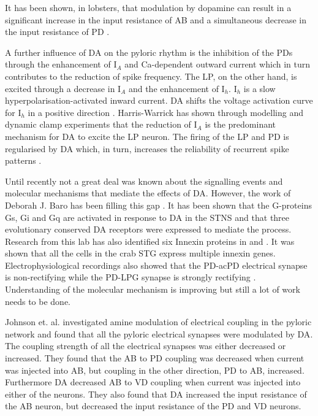 It has been shown, in lobsters, that modulation by dopamine can result in a significant increase in the input resistance of \ac{AB} and a simultaneous decrease in the input resistance of \ac{PD} \cite{Zhao2010}.

A further influence of \ac{DA} on the pyloric rhythm is the inhibition of the \ac{PD}s through the enhancement of I$_A$ and Ca-dependent outward current which in turn contributes to the reduction of spike frequency. The \ac{LP}, on the other hand, is excited through a decrease in I$_A$ and the enhancement of I$_h$. I$_h$ is a slow hyperpolarisation-activated inward current. \ac{DA} shifts the voltage activation curve for I$_h$ in a positive direction \cite{Harris-warrick1998}. Harris-Warrick \cite{Harris-warrick1998} has shown through modelling and dynamic clamp experiments that the reduction of I$_A$ is the predominant mechanism for \ac{DA} to excite the \ac{LP} neuron. The firing of the \ac{LP} and {PD} is regularised by \ac{DA} which, in turn, increases the reliability of recurrent spike patterns \cite{Szucs2005}.

Until recently not a great deal was known about the signalling events and molecular mechanisms that mediate the effects of \ac{DA}. However, the work of Deborah J. Baro has been filling this gap  \cite{Clark2007}. It has been shown that the G-proteins Gs, Gi and Gq are activated in response to \ac{DA} in the \ac{STNS} and that three evolutionary conserved \ac{DA} receptors were expressed to mediate the process. Research from this lab has also identified six Innexin proteins in  and . It was shown that all the cells in the crab \ac{STG} express multiple innexin genes. Electrophysiological recordings also showed that the \ac{PD}-ac{PD} electrical synapse is non-rectifying while the \ac{PD}-\ac{LPG} synapse is strongly rectifying \cite{Shruti2014}.
 Understanding of the molecular mechanism is improving but still a lot of work needs to be done.

Johnson et. al. \cite{Johnson1993} investigated amine modulation of electrical coupling in the pyloric network and found that all the pyloric electrical synapses were modulated by \ac{DA}. The coupling strength of all the electrical synapses was either decreased or increased. They found that the \ac{AB} to \ac{PD} coupling was decreased when current was injected into \ac{AB}, but coupling in the other direction, \ac{PD} to \ac{AB}, increased. Furthermore \ac{DA} decreased \ac{AB} to \ac{VD} coupling when current was injected into either of the neurons. They also found that \ac{DA} increased the input resistance of the \ac{AB} neuron, but decreased the input resistance of the \ac{PD} and \ac{VD} neurons.


